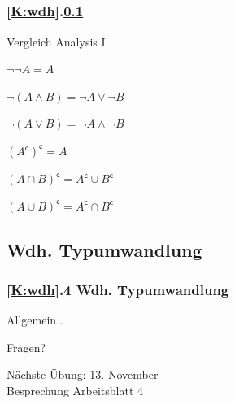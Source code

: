 \documentclass[c,18pt]{beamer}
\begin{document}
\subsection{\stitle}\label{S:Morgansche}
\begin{frame}[fragile]%
  \frametitle{\ref{K:wdh}.\ref{S:Morgansche} \stitle}%
Vergleich Analysis I
\medskip

\begin{description}
  \item[und bzw. oder]
  \item $\neg \neg A = A$
  \item $\neg (A \wedge B) = \neg A \vee \neg B$
  \item $\neg (A \vee B) = \neg A \wedge \neg B$
\end{description}
\medskip

\begin{description}
  \item[Schnittmenge bzw. Vereinigung]
  \item $(A^{\mathsf{c}})^{\mathsf{c}} = A$
  \item $(A \cap B)^{\mathsf{c}} = A^{\mathsf{c}} \cup B^{\mathsf{c}}$
  \item $(A \cup B)^{\mathsf{c}} = A^{\mathsf{c}} \cap B^{\mathsf{c}}$
\end{description}

\end{frame}


\setcounter{exercise}{9}

\def\stitle{Wdh. Typumwandlung}
\subsection{\stitle}\label{S:Typumwandlung}
\begin{frame}[fragile]%
  \frametitle{\ref{K:wdh}.4 \stitle}%
\medskip

Allgemein .


\end{frame}
\setcounter{exercise}{10}

\setcounter{exercise}{11}

\setcounter{exercise}{12}



\begin{frame}
\centering
\Huge\textcolor{KITgreen}{Fragen?}
\vspace{2cm}

{\LARGE
Nächste Übung: 13. November\\
Besprechung Arbeitsblatt 4
}
\end{frame}


\end{document}
